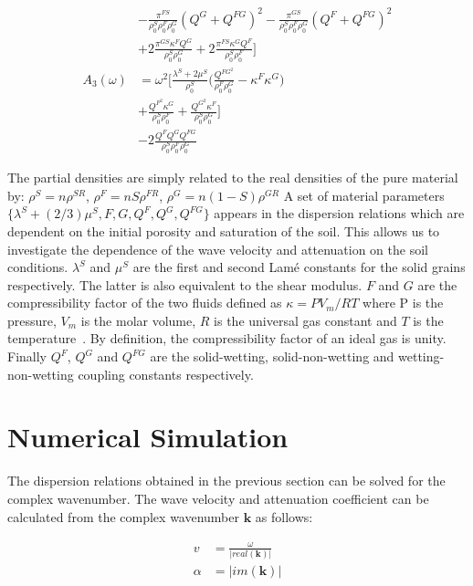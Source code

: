 \documentclass[twocolumn]{article}
\begin{document}
\begin{align*}
                & -\frac{\pi^{FS}}{\rho_0^S\rho_0^F\rho_0^G}(Q^G + Q^{FG})^2
    -\frac{\pi^{GS}}{\rho_0^S\rho_0^F\rho_0^G}(Q^F + Q^{FG})^2                                                 \\
                & + 2\frac{\pi^{GS}\kappa^FQ^G}{\rho_0^S\rho_0^G}
    + 2\frac{\pi^{FS}\kappa^GQ^F}{\rho_0^S\rho_0^F}\bigr]                                                      \\
    A_3(\omega) & = \omega^2\bigl[\frac{\lambda^S + 2\mu^S}{\rho_0^S}
    \bigl(\frac{Q^{FG^2}}{\rho_0^F\rho_0^G} - \kappa^F\kappa^G\bigr)                                           \\
                & +\frac{Q^{F^2}\kappa^G}{\rho_0^S\rho_0^F}+\frac{Q^{G^2}\kappa^F}{\rho_0^S\rho_0^G}\bigr]     \\
                & -2\frac{Q^FQ^GQ^{FG}}{\rho_0^S\rho_0^F\rho_0^G}
\end{align*}

The partial densities are simply related to the real densities of the pure material by:
$\rho^S = n\rho^{SR}$, $\rho^F = nS\rho^{FR}$, $\rho^G = n(1-S)\rho^{GR}$
A set of material parameters $\{\lambda^S + (2/3)\mu^S, F, G, Q^F, Q^G, Q^{FG}\}$ appears in the dispersion relations which are dependent on the initial porosity and saturation of the soil. This allows us to investigate the dependence of the wave velocity and attenuation on the soil conditions. $\lambda^S$ and $\mu^S$ are the first and second Lamé constants for the solid grains respectively. The latter is also equivalent to the shear modulus. $F$ and $G$ are the compressibility factor of the two fluids defined as $\kappa = PV_m/RT$ where P is the pressure, $V_m$ is the molar volume, $R$ is the universal gas constant and $T$ is the temperature~\cite{mcquarrie_simon_1999}. By definition, the compressibility factor of an ideal gas is unity. Finally $Q^F$, $Q^G$ and $Q^{FG}$ are the solid-wetting, solid-non-wetting and wetting-non-wetting coupling constants respectively.

\section{Numerical Simulation}
The dispersion relations obtained in the previous section can be solved for the complex wavenumber. The wave velocity and attenuation coefficient can be calculated from the complex wavenumber $\textbf{k}$ as follows:

\begin{align}
    v      & = \frac{\omega}{|real(\textbf{k})|} \\
    \alpha & = |im(\textbf{k})|
\end{align}
\end{document}
